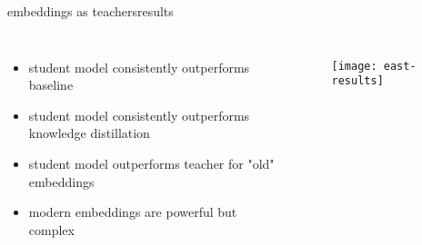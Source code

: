 \begin{frame}{embeddings as teachers}{results}
    \begin{columns}
			\begin{itemize}
					\item   student model consistently outperforms baseline
					\smallskip
					\item   student model consistently outperforms knowledge distillation
					\smallskip
					\item   student model outperforms teacher for "old" embeddings
					\smallskip
					\item   modern embeddings are powerful but complex
			\end{itemize}
			\begin{figure}
			\texttt{[image: east-results]}
			\end{figure}
		\end{columns}
\end{frame}

 